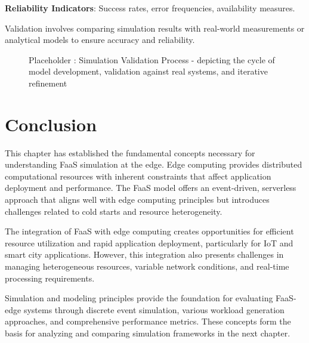 \textbf{Reliability Indicators}: Success rates, error frequencies, availability measures.

Validation involves comparing simulation results with real-world measurements or analytical models to ensure accuracy and reliability.

\begin{figure}[h]
    \centering
    \caption{Placeholder : Simulation Validation Process - depicting the cycle of model development, validation against real systems, and iterative refinement}
    \label{fig:simulation_validation}
\end{figure}


\section{Conclusion}

This chapter has established the fundamental concepts necessary for understanding FaaS simulation at the edge. Edge computing provides distributed computational resources with inherent constraints that affect application deployment and performance. The FaaS model offers an event-driven, serverless approach that aligns well with edge computing principles but introduces challenges related to cold starts and resource heterogeneity.

The integration of FaaS with edge computing creates opportunities for efficient resource utilization and rapid application deployment, particularly for IoT and smart city applications. However, this integration also presents challenges in managing heterogeneous resources, variable network conditions, and real-time processing requirements.

Simulation and modeling principles provide the foundation for evaluating FaaS-edge systems through discrete event simulation, various workload generation approaches, and comprehensive performance metrics. These concepts form the basis for analyzing and comparing simulation frameworks in the next chapter.
